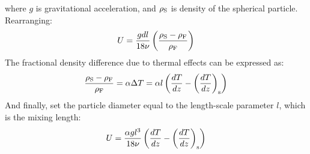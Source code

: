 where $g$ is gravitational acceleration, and $\rho_{\rm S}$ is density of the spherical particle.  Rearranging:
\begin{equation}
U = \frac{gdl}{18 \nu} \left( \frac{\rho_{\rm S} - \rho_{\rm F}}{\rho_{\rm F}} \right)
\end{equation}
The fractional density difference due to thermal effects can be expressed as: 
\begin{equation}
\frac{\rho_{\rm S} - \rho_{\rm F}}{\rho_{\rm F}} = \alpha \Delta T = \alpha l \left( \frac{dT}{dz} - \left( \frac{dT}{dz} \right)_{\rm s} \right)
\end{equation}
And finally, set the particle diameter equal to the length-scale parameter $l$, which is the mixing length: 
\begin{equation}
U = \frac{\alpha g l^3}{18 \nu} \left( \frac{dT}{dz} - \left( \frac{dT}{dz} \right)_{\rm s} \right)
\end{equation}
